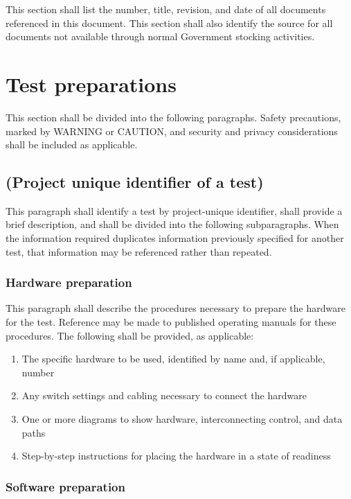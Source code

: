 \documentclass{fidata-report-template}
\begin{document}
This section shall list the number, title, revision, and date of all
documents referenced in this document. This section shall also identify
the source for all documents not available through normal Government
stocking activities.

\section{Test preparations}

This section shall be divided into the following paragraphs. Safety
precautions, marked by WARNING or CAUTION, and security and privacy
considerations shall be included as applicable.

\subsection{(Project unique identifier of a test)}

This paragraph shall identify a test by project-unique identifier, shall
provide a brief description, and shall be divided into the following
subparagraphs. When the information required duplicates information
previously specified for another test, that information may be
referenced rather than repeated.

\subsubsection{Hardware preparation}

This paragraph shall describe the procedures necessary to prepare the
hardware for the test. Reference may be made to published operating
manuals for these procedures. The following shall be provided, as
applicable:

\begin{enumerate}
\itemsep1pt\parskip0pt
\item
  The specific hardware to be used, identified by name and, if
  applicable, number
\item
  Any switch settings and cabling necessary to connect the hardware
\item
  One or more diagrams to show hardware, interconnecting control, and
  data paths
\item
  Step-by-step instructions for placing the hardware in a state of
  readiness
\end{enumerate}

\subsubsection{Software preparation}
\end{document}
